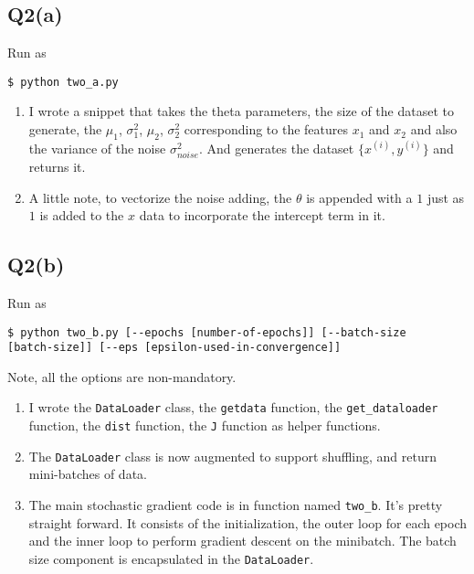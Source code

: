 \documentclass[11pt]{article}
\begin{document}
\subsection{Q2(a)}
\label{sec:orge29d38b}
\begin{codebox}
Run as
\begin{verbatim}
$ python two_a.py
\end{verbatim}
\end{codebox}
\begin{enumerate}
\item I wrote a snippet that takes the theta parameters, the size of
the dataset to generate, the \(\mu_1\), \(\sigma^2_1\), \(\mu_2\),
\(\sigma^2_2\) corresponding to the features \(x_1\) and \(x_2\) and
also the variance of the noise \(\sigma^2_{noise}\). And generates
the dataset \(\{x^{(i)},y^{(i)}\}\) and returns it.
\item A little note, to vectorize the noise adding, the
\(\theta\) is appended with a \(1\) just as \(1\) is added to
the \(x\) data to incorporate the intercept term in it.
\end{enumerate}
\subsection{Q2(b)}
\label{sec:org8ea60f9}
\begin{codebox}
Run as
\begin{verbatim}
$ python two_b.py [--epochs [number-of-epochs]] [--batch-size
[batch-size]] [--eps [epsilon-used-in-convergence]]
\end{verbatim}
Note, all the options are non-mandatory.
\end{codebox}
\begin{enumerate}
\item I wrote the \texttt{DataLoader} class, the \texttt{getdata} function, the
\texttt{get\_dataloader} function, the \texttt{dist} function,
the \texttt{J} function as helper functions.
\item The \texttt{DataLoader} class is now augmented to support
shuffling, and return mini-batches of data.
\item The main stochastic gradient code is in function named
\texttt{two\_b}. It's pretty straight forward. It consists of the
initialization, the outer loop for each epoch and the inner loop
to perform gradient descent on the minibatch. The batch size
component is encapsulated in the \texttt{DataLoader}.
\end{enumerate}
\end{document}
